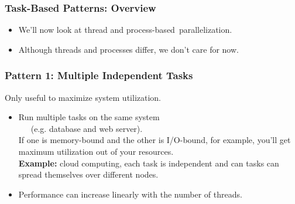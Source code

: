 \documentclass[aspectratio=43]{beamer}
\newenvironment{changemargin}[1]{%
  \begin{list}{}{%
    \setlength{\topsep}{0pt}%
    \setlength{\leftmargin}{#1}%
    \setlength{\rightmargin}{1em}
    \setlength{\listparindent}{\parindent}%
    \setlength{\itemindent}{\parindent}%
    \setlength{\parsep}{\parskip}%
  }%
  \item[]}{\end{list}}
\begin{document}
\begin{frame}
  \frametitle{Task-Based Patterns: Overview}

\Large
  \begin{changemargin}{1.5cm}
  \begin{itemize}
    \item We'll now look at thread and process-based~parallelization.
    \item Although threads and processes differ, we don't care for now.
  \end{itemize}
  \end{changemargin}

\end{frame}

\begin{frame}
  \frametitle{Pattern 1: Multiple Independent Tasks}

  \begin{changemargin}{1.5cm}
    Only useful to maximize system utilization.
  \begin{itemize}
    \item Run multiple tasks on the same system \\ ~~~(e.g. database and web server).\\[1em]
     If one is memory-bound and the other is I/O-bound, for example, you'll
      get maximum utilization out of your resources.\\[1em]
     {\bf Example:} cloud computing, each task is independent and can
      tasks can spread themselves over different nodes.\\[1em]
    \item Performance can increase linearly with the number of threads.
  \end{itemize}
  \end{changemargin}
\end{frame}
\end{document}

